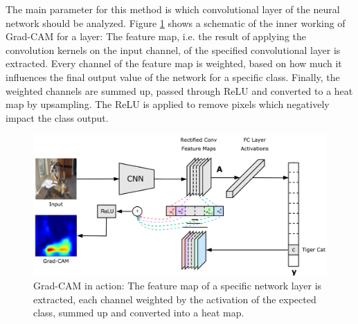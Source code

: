 The main parameter for this method is which convolutional layer of the neural network should be analyzed. Figure \ref{grad_cam_explanation} shows a schematic of the inner working of Grad-CAM for a layer: The feature map, i.e. the result of applying the convolution kernels on the input channel, of the specified convolutional layer is extracted. Every channel of the feature map is weighted, based on how much it influences the final output value of the network for a specific class. Finally, the weighted channels are summed up, passed through ReLU and converted to a heat map by upsampling. The ReLU is applied to remove pixels which negatively impact the class output.

\begin{figure}[H]
\centering
\includegraphics[width=12cm]{chapters/02_methods/images/grad-cam.png}
\caption{Grad-CAM in action: The feature map of a specific network layer is extracted, each channel weighted by the activation of the expected class, summed up and converted into a heat map.}
\label{grad_cam_explanation}
\end{figure}

